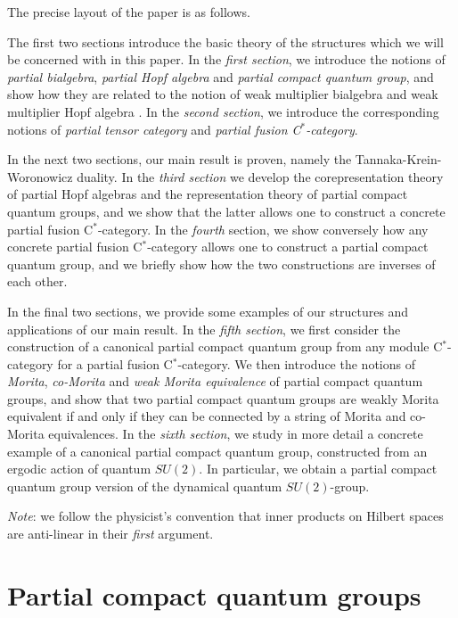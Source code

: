 \documentclass[11pt]{article}
\theoremstyle{definition}
\numberwithin{equation}{section}
\begin{document}
The precise layout of the paper is as follows.

The first two sections introduce the basic theory of the structures which we will be concerned with in this paper. In the \emph{first section}, we introduce the notions of \emph{partial bialgebra}, \emph{partial Hopf algebra} and \emph{partial compact quantum group}, and show how they are related to the notion of weak multiplier bialgebra \cite{Boh1} and weak multiplier Hopf algebra \cite{VDW1,VDW2}. In the \emph{second section}, we introduce the corresponding notions of \emph{partial tensor category} and \emph{partial fusion C$^*$-category}. 

In the next two sections, our main result is proven, namely the Tannaka-Krein-Woronowicz duality. In the \emph{third section} we develop the corepresentation theory of partial Hopf algebras and the representation theory of partial compact quantum groups, and we show that the latter allows one to construct a concrete partial fusion C$^*$-category. In the \emph{fourth} section, we show conversely how any concrete partial fusion C$^*$-category allows one to construct a partial compact quantum group, and we briefly show how the two constructions are inverses of each other.

In the final two sections, we provide some examples of our structures and applications of our main result. In the \emph{fifth section}, we first consider the construction of a canonical partial compact quantum group from any module C$^*$-category for a partial fusion C$^*$-category. We then introduce the notions of \emph{Morita}, \emph{co-Morita} and \emph{weak Morita equivalence} \cite{Mug1} of partial compact quantum groups, and show that two partial compact quantum groups are weakly Morita equivalent if and only if they can be connected by a string of Morita and co-Morita equivalences. In the \emph{sixth section}, we study in more detail a concrete example of a canonical partial compact quantum group, constructed from an ergodic action of quantum $SU(2)$. In particular, we obtain a partial compact quantum group version of the dynamical quantum $SU(2)$-group. 

\emph{Note}: we follow the physicist's convention that inner products on Hilbert spaces are anti-linear in their \emph{first} argument. 


\section{Partial compact quantum groups}
\end{document}
